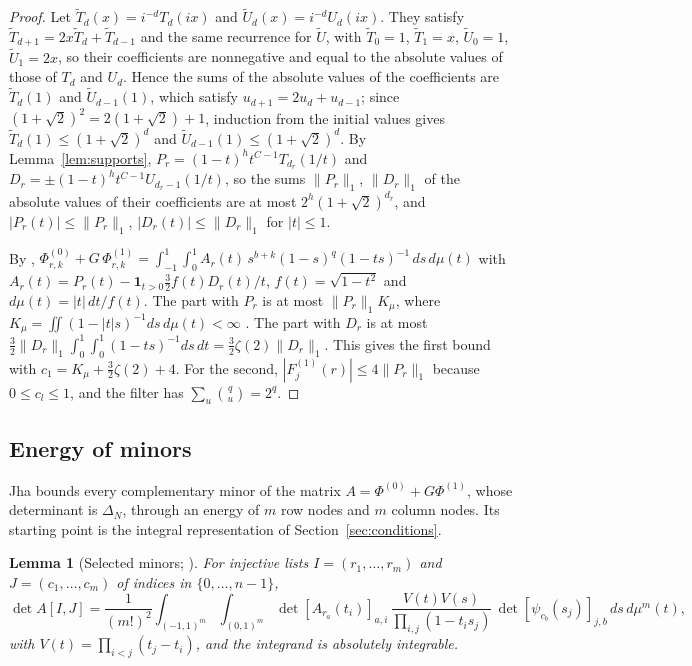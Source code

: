 \documentclass[11pt]{article}
\newtheorem{lemma}[theorem]{Lemma}
\theoremstyle{definition}
\begin{document}
\begin{proof}
Let $\tilde T_d(x)=i^{-d}T_d(ix)$ and $\tilde U_d(x)=i^{-d}U_d(ix)$. They satisfy $\tilde T_{d+1}=2x\tilde T_d+\tilde T_{d-1}$ and the same recurrence for $\tilde U$, with $\tilde T_0=1$, $\tilde T_1=x$, $\tilde U_0=1$, $\tilde U_1=2x$, so their coefficients are nonnegative and equal to the absolute values of those of $T_d$ and $U_d$. Hence the sums of the absolute values of the coefficients are $\tilde T_d(1)$ and $\tilde U_{d-1}(1)$, which satisfy $u_{d+1}=2u_d+u_{d-1}$; since $(1+\sqrt2)^2=2(1+\sqrt2)+1$, induction from the initial values gives $\tilde T_d(1)\le(1+\sqrt2)^d$ and $\tilde U_{d-1}(1)\le(1+\sqrt2)^d$. By Lemma~\ref{lem:supports}, $P_r=(1-t)^ht^{C-1}T_{d_r}(1/t)$ and $D_r=\pm(1-t)^ht^{C-1}U_{d_r-1}(1/t)$, so the sums $\|P_r\|_1$, $\|D_r\|_1$ of the absolute values of their coefficients are at most $2^h(1+\sqrt2)^{d_r}$, and $|P_r(t)|\le\|P_r\|_1$, $|D_r(t)|\le\|D_r\|_1$ for $|t|\le1$.

By \cite[Sec.~5.1]{OAI}, $\Phi^{(0)}_{r,k}+G\,\Phi^{(1)}_{r,k}=\int_{-1}^1\int_0^1A_r(t)\,s^{b+k}(1-s)^q(1-ts)^{-1}\,ds\,d\mu(t)$ with $A_r(t)=P_r(t)-\mathbf 1_{t>0}\frac32f(t)D_r(t)/t$, $f(t)=\sqrt{1-t^2}$ and $d\mu(t)=|t|\,dt/f(t)$. The part with $P_r$ is at most $\|P_r\|_1K_\mu$, where $K_\mu=\iint(1-|t|s)^{-1}ds\,d\mu(t)<\infty$ \cite[Sec.~5.1]{OAI}. The part with $D_r$ is at most $\frac32\|D_r\|_1\int_0^1\int_0^1(1-ts)^{-1}ds\,dt=\frac32\zeta(2)\|D_r\|_1$. This gives the first bound with $c_1=K_\mu+\frac32\zeta(2)+4$. For the second, $|F^{(1)}_j(r)|\le4\|P_r\|_1$ because $0\le c_l\le1$, and the filter has $\sum_u\binom qu=2^q$.
\end{proof}

\subsection{Energy of minors}\label{xsec:minors}

Jha \cite[Sections~5--6]{Jha} bounds every complementary minor of the matrix $A=\Phi^{(0)}+G\Phi^{(1)}$, whose determinant is $\Delta_N$, through an energy of $m$ row nodes and $m$ column nodes. Its starting point is the integral representation of Section~\ref{sec:conditions}.

\begin{lemma}[Selected minors; {\cite[Lemma~6.1]{Jha}}]\label{xlem:selected}
For injective lists $I=(r_1,\dots,r_m)$ and $J=(c_1,\dots,c_m)$ of indices in $\{0,\dots,n-1\}$,
\[
\det A[I,J]=\frac1{(m!)^2}\int_{(-1,1)^m}\int_{(0,1)^m}\det[A_{r_a}(t_i)]_{a,i}\,\frac{V(t)V(s)}{\prod_{i,j}(1-t_is_j)}\,\det[\psi_{c_b}(s_j)]_{j,b}\,ds\,d\mu^m(t),
\]
with $V(t)=\prod_{i<j}(t_j-t_i)$, and the integrand is absolutely integrable.
\end{lemma}
\end{document}

